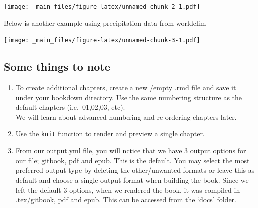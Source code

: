 \documentclass[
]{book}
\newenvironment{Shaded}{\begin{snugshade}}{\end{snugshade}}
\newcommand{\AttributeTok}[1]{\textcolor[rgb]{0.77,0.63,0.00}{#1}}
\newcommand{\CommentTok}[1]{\textcolor[rgb]{0.56,0.35,0.01}{\textit{#1}}}
\newcommand{\DecValTok}[1]{\textcolor[rgb]{0.00,0.00,0.81}{#1}}
\newcommand{\FunctionTok}[1]{\textcolor[rgb]{0.00,0.00,0.00}{#1}}
\newcommand{\NormalTok}[1]{#1}
\newcommand{\OtherTok}[1]{\textcolor[rgb]{0.56,0.35,0.01}{#1}}
\newcommand{\SpecialCharTok}[1]{\textcolor[rgb]{0.00,0.00,0.00}{#1}}
\newcommand{\StringTok}[1]{\textcolor[rgb]{0.31,0.60,0.02}{#1}}
\providecommand{\tightlist}{%
  \setlength{\itemsep}{0pt}\setlength{\parskip}{0pt}}
\begin{document}
\texttt{[image: \_main\_files/figure-latex/unnamed-chunk-2-1.pdf]}

Below is another example using precipitation data from worldclim

\begin{Shaded}
\end{Shaded}

\texttt{[image: \_main\_files/figure-latex/unnamed-chunk-3-1.pdf]}

\hypertarget{some-things-to-note}{%
\subsection{Some things to note}\label{some-things-to-note}}

\begin{enumerate}
\def\labelenumi{\arabic{enumi}.}
\tightlist
\item
  To create additional chapters, create a new /empty .rmd file and save it under your bookdown directory. Use the same numbering structure as the default chapters (i.e.~01,02,03, etc).\\
  We will learn about advanced numbering and re-ordering chapters later.\\
\item
  Use the \texttt{knit} function to render and preview a single chapter.\\
\item
  From our output.yml file, you will notice that we have 3 output options for our file; gitbook, pdf and epub. This is the default. You may select the most preferred output type by deleting the other/unwanted formats or leave this as default and choose a single output format when building the book. Since we left the default 3 options, when we rendered the book, it was compiled in .tex/gitbook, pdf and epub. This can be accessed from the `docs' folder.
\end{enumerate}
\end{document}

